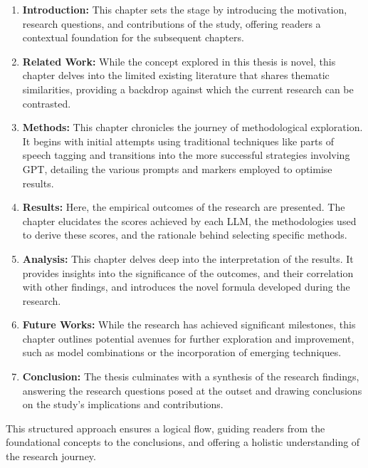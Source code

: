 \begin{enumerate}
    \item \textbf{Introduction:} This chapter sets the stage by introducing the motivation, research questions, and contributions of the study, offering readers a contextual foundation for the subsequent chapters.
    
    \item \textbf{Related Work:} While the concept explored in this thesis is novel, this chapter delves into the limited existing literature that shares thematic similarities, providing a backdrop against which the current research can be contrasted.
    
    \item \textbf{Methods:} This chapter chronicles the journey of methodological exploration. It begins with initial attempts using traditional techniques like parts of speech tagging and transitions into the more successful strategies involving GPT, detailing the various prompts and markers employed to optimise results.
    
    \item \textbf{Results:} Here, the empirical outcomes of the research are presented. The chapter elucidates the scores achieved by each LLM, the methodologies used to derive these scores, and the rationale behind selecting specific methods.
    
    \item \textbf{Analysis:} This chapter delves deep into the interpretation of the results. It provides insights into the significance of the outcomes, and their correlation with other findings, and introduces the novel formula developed during the research.
    
    \item \textbf{Future Works:} While the research has achieved significant milestones, this chapter outlines potential avenues for further exploration and improvement, such as model combinations or the incorporation of emerging techniques.
    
    \item \textbf{Conclusion:} The thesis culminates with a synthesis of the research findings, answering the research questions posed at the outset and drawing conclusions on the study's implications and contributions.
\end{enumerate}

This structured approach ensures a logical flow, guiding readers from the foundational concepts to the conclusions, and offering a holistic understanding of the research journey.

